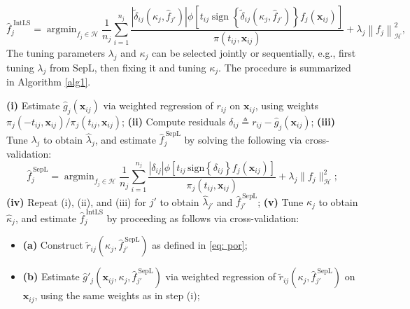 \documentclass[12pt]{article}
\DeclareMathOperator*{\argmin}{argmin}
\DeclareMathOperator{\sign}{sign}
\begin{document}
\begin{equation}
    \widehat{f}_j^\text{\ IntLS}=\argmin_{f_j\in\mathcal{H}} \frac{1}{n_j}\sum^{n_j}_{i=1}\frac{\left|\widetilde{\delta}_{ij}\left(\kappa_j, \widehat{f}_{j'}\right)\right|\phi\left[t_{ij}\sign\left\{\widetilde{\delta}_{ij}\left(\kappa_j, \widehat{f}_{j'}\right)\right\}f_j(\boldsymbol x_{ij})\right]}{\pi\left(t_{ij},\boldsymbol x_{ij}\right)}+\lambda_j\left\|f_j\right\|^2_\mathcal{H}, \label{eq: IntLS-AOL}
\end{equation}
The tuning parameters $\lambda_j$ and $\kappa_j$ can be selected jointly or sequentially, e.g., first tuning $\lambda_j$ from SepL, then fixing it and tuning $\kappa_j$. The procedure is summarized in Algorithm \ref{alg1}.

\begin{algorithm}[h]
\caption{IntLS Algorithm}\label{alg1}
\begin{algorithmic}
\State \textbf{(i)} Estimate $\widehat{g}_j(\boldsymbol{x}_{ij})$ via weighted regression of $r_{ij}$ on $\boldsymbol{x}_{ij}$, using weights $\pi_j(-t_{ij}, \boldsymbol{x}_{ij})/\pi_j(t_{ij}, \boldsymbol{x}_{ij})$;
\State \textbf{(ii)} Compute residuals $\delta_{ij} \triangleq r_{ij} - \widehat{g}_j(\boldsymbol{x}_{ij})$;
\State \textbf{(iii)} Tune $\lambda_j$ to obtain $\widehat{\lambda}_j$, and estimate $\widehat{f}_j^{\ \text{SepL}}$ by solving the following via cross-validation:
\[
\widehat{f}_j^{\ \text{SepL}} = \argmin_{f_j \in \mathcal{H}} \frac{1}{n_j} \sum_{i=1}^{n_j} \frac{\left|\delta_{ij}\right| \phi\left[t_{ij} \, \text{sign}\left\{\delta_{ij}\right\} f_j(\boldsymbol{x}_{ij})\right]}{\pi_j(t_{ij}, \boldsymbol{x}_{ij})} + \lambda_j \|f_j\|_{\mathcal{H}}^2;
\]
\State \textbf{(iv)} Repeat (i), (ii), and (iii) for $j'$ to obtain $\widehat{\lambda}_{j'}$ and $\widehat{f}_{j'}^{\ \text{SepL}}$;
\State \textbf{(v)} Tune $\kappa_j$ to obtain $\widehat{\kappa}_j$, and estimate  $\widehat{f}_j^{\ \text{IntLS}}$ by proceeding as follows via cross-validation:
\begin{itemize}
    \item[] \textbf{(a)} Construct $\widetilde{r}_{ij}\left(\kappa_j, \widehat{f}_{j'}^{\ \text{SepL}}\right)$ as defined in \eqref{eq: por};        
    \item[] \textbf{(b)} Estimate $\widehat{g}'_j\left(\boldsymbol{x}_{ij}, \kappa_j, \widehat{f}_{j'}^{\ \text{SepL}}\right)$ via weighted regression of $\widetilde{r}_{ij}\left(\kappa_j, \widehat{f}_{j'}^{\ \text{SepL}}\right)$ on $\boldsymbol{x}_{ij}$, using the same weights as in step (i);

\end{itemize}
\end{algorithmic}
\end{algorithm}
\end{document}
